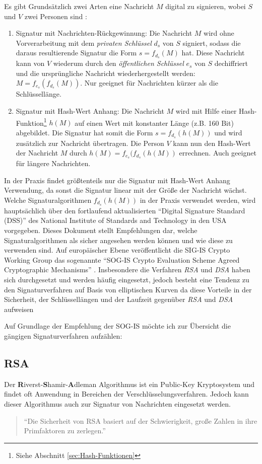 \documentclass[11pt,a4paper,ngerman]{scrreprt}
\begin{document}
Es gibt Grundsätzlich zwei Arten eine Nachricht $M$ digital zu signieren, wobei $S$ und $V$ zwei Personen sind \cite[S. 28-29]{kryptSec11}:
\begin{enumerate}
    \item Signatur mit Nachrichten-Rückgewinnung: Die Nachricht $M$ wird ohne Vorverarbeitung mit dem \emph{privaten Schlüssel} $d_s$ von $S$ signiert, sodass die daraus resultierende Signatur die Form $s = f_{d_s}(M)$ hat. Diese Nachricht kann von $V$ wiederum durch den \emph{öffentlichen Schlüssel} $e_s$ von $S$ dechiffriert und die ursprüngliche Nachricht wiederhergestellt werden: $M = f_{e_s}(f_{d_s}(M))$. Nur geeignet für Nachrichten kürzer als die Schlüssellänge.
    \item Signatur mit Hash-Wert Anhang: Die Nachricht $M$ wird mit Hilfe einer Hash-Funktion\footnote{Siehe Abschnitt \ref{sec:Hash-Funktionen}} $h(M)$ auf einen Wert mit konstanter Länge (z.B. 160 Bit) abgebildet. Die Signatur hat somit die Form $s = f_{d_s}(h(M))$ und wird zusätzlich zur Nachricht übertragen. Die Person $V$ kann nun den Hash-Wert der Nachricht $M$ durch $h(M) = f_{e_s}(f_{d_s}(h(M))$ errechnen. Auch geeignet für längere Nachrichten.
\end{enumerate}
In der Praxis findet größtenteils nur die Signatur mit Hash-Wert Anhang Verwendung, da sonst die Signatur linear mit der Größe der Nachricht wächst. Welche Signaturalgorithmen $f_{d_s}(h(M))$ in der Praxis verwendet werden, wird hauptsächlich über den fortlaufend aktualisierten ``Digital Signature Standard (DSS)'' des National Institute of Standards and Technology in den USA vorgegeben. Dieses Dokument stellt Empfehlungen dar, welche Signaturalgorithmen als sicher angesehen werden können und wie diese zu verwenden sind. Auf europäischer Ebene veröffentlicht die SIG-IS Crypto Working Group das sogenannte ``SOG-IS Crypto Evaluation Scheme Agreed Cryptographic Mechanisms'' \cite{sogisACM}. Insbesondere die Verfahren \textit{RSA} und \textit{DSA} haben sich durchgesetzt und werden häufig eingesetzt, jedoch besteht eine Tendenz zu den Signaturverfahren auf Basis von elliptischen Kurven da diese Vorteile in der Sicherheit, der Schlüssellängen und der Laufzeit gegenüber \textit{RSA} und \textit{DSA} aufweisen \cite[S. 59]{komSec13}

Auf Grundlage der Empfehlung der SOG-IS möchte ich zur Übersicht die gängigen Signaturverfahren aufzählen:
\subsection{RSA}
Der \textbf{R}iverst-\textbf{S}hamir-\textbf{A}dleman Algorithmus ist ein Public-Key Kryptosystem und findet oft Anwendung in Bereichen der Verschlüsselungsverfahren. Jedoch kann dieser Algorithmus auch zur Signatur von Nachrichten eingesetzt werden. 
\begin{quote}
    ``Die Sicherheit von RSA basiert auf der Schwierigkeit, große Zahlen in ihre Primfaktoren zu zerlegen.'' \cite[S. 82]{ertel12}
\end{quote}
\end{document}
